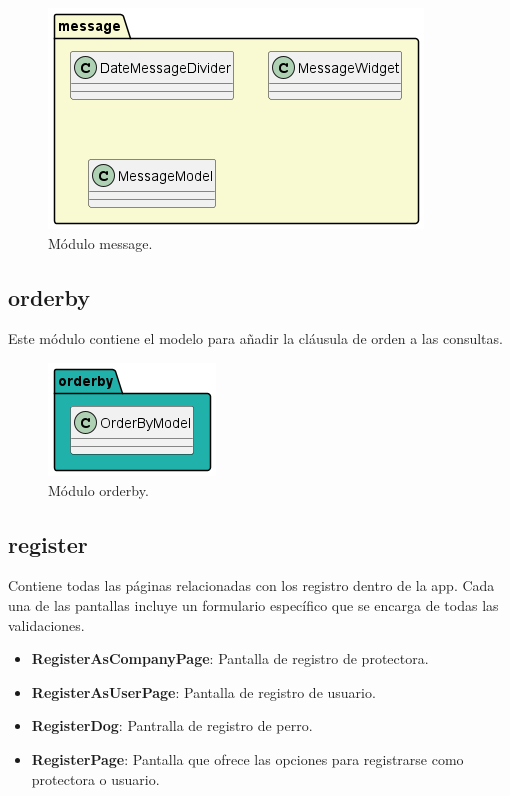 \documentclass[a4paper, 12pt]{article}
\begin{document}
\begin{figure}[H]
	\begin{center}
		{\includegraphics[width=0.8\linewidth]{diagram/Message.png}\par}
		\caption{Módulo message.}
	\end{center}
\end{figure}


\subsection*{orderby}

Este módulo contiene el modelo para añadir la cláusula de orden a las consultas.

\begin{figure}[H]
	\begin{center}
		{\includegraphics[]{diagram/OrderBy.png}\par}
		\caption{Módulo orderby.}
	\end{center}
\end{figure}


\subsection*{register}

Contiene todas las páginas relacionadas con los registro dentro de la app. Cada una de las pantallas incluye un formulario específico que se encarga de todas las validaciones.

\begin{itemize}[noitemsep]
	\item \textbf{RegisterAsCompanyPage}: Pantalla de registro de protectora.
	\item \textbf{RegisterAsUserPage}: Pantalla de registro de usuario.
	\item \textbf{RegisterDog}: Pantralla de registro de perro.
	\item \textbf{RegisterPage}:  Pantalla que ofrece las opciones para registrarse como protectora o usuario.
\end{itemize}
\end{document}
